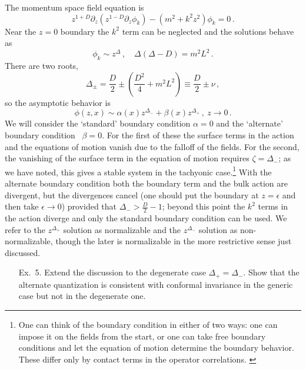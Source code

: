 \documentclass[12pt]{article}
\begin{document}
{The momentum space field equation is
\begin{equation}
z^{1+D} \partial_z (z^{1-D} \partial_z \phi_k) - (m^2 + k^2 z^2) \phi_k  = 0 \,.
\end{equation}
Near the $z=0$ boundary the $k^2$ term can be neglected and the solutions behave as
\begin{equation}
\phi_k \sim z^\Delta \,, \quad \Delta(\Delta - D) = m^2 L^2 \,.  \label{deltam2l2}
\end{equation}
There are two roots, 
\begin{equation}
\Delta_{\pm} = \frac{D}{2} \pm \left( \frac{D^2}{4} + m^2 L^2 \right) \equiv  \frac{D}{2} \pm \nu  \,,
\label{dpm}
\end{equation}
so the asymptotic behavior is
\begin{equation}
\phi(z,x) \sim \alpha(x) z^{\Delta_-} + \beta(x) z^{\Delta_+}  \,,\ z \to 0\,.
\end{equation}
We will consider the `standard' boundary condition $\alpha = 0$ and the `alternate' boundary condition~\cite{Klebanov:1999tb} $\beta =0$.  For the first of these the surface terms in the action and the equations of motion vanish due to the falloff of the fields.  For the second, the vanishing of the surface term in the equation of motion requires $\zeta = \Delta_-$; as we have noted, this gives a stable system in the tachyonic case.\footnote{One can think of the boundary condition in either of two ways: one can impose it on the fields from the start, or one can take free boundary conditions and let the equation of motion determine the boundary behavior.  These differ only by contact terms in the operator correlations. 
 \label{fixedfree}}  With the alternate boundary condition both the boundary term and the bulk action are divergent, but the divergences cancel (one should put the boundary at $z =\epsilon$ and then take $\epsilon \to 0$) provided that $\Delta_- > \frac{D}{2} - 1$; beyond this point the $k^2$ terms in the action diverge and only the standard boundary condition can be used.  We refer to the $z^{\Delta_+}$ solution as normalizable and the $z^{\Delta_-}$ solution as non-normalizable, though the later is normalizable in the more restrictive sense just discussed.
 
 \begin{enumerate}

\item[Ex.\ 5.] Extend the discussion to the degenerate case $\Delta_+ = \Delta_-$.  Show that the 
alternate quantization is consistent with conformal invariance in the generic case but not in the degenerate one.
\end{enumerate}

}
\end{document}
